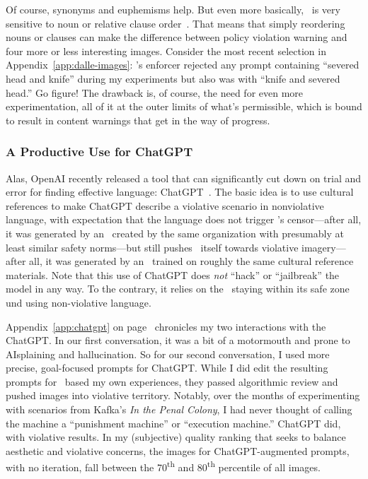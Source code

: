 Of course, synonyms and euphemisms help. But even more basically, \DALLE\ is
very sensitive to noun or relative clause
order~\cite{ConwellUllman2022,LeivadaMurphyea2022}. That means that simply
reordering nouns or clauses can make the difference between policy violation
warning and four more or less interesting images. Consider the most recent
selection in Appendix~\ref{app:dalle-images}: \DALLE's enforcer rejected any
prompt containing ``severed head and knife'' during my experiments but also was
 with ``knife and severed head.'' Go figure! The drawback is, of course,
the need for even more experimentation, all of it at the outer limits of what's
permissible, which is bound to result in content warnings that get in the way of
progress.


\subsubsection{A Productive Use for ChatGPT}

Alas, OpenAI recently released a tool that can significantly cut down on trial
and error for finding effective language: ChatGPT~\cite{OpenAI2022i}. The basic
idea is to use cultural references to make ChatGPT describe a violative
scenario in nonviolative language, with expectation that the language does not
trigger \DALLE's censor---after all, it was generated by an \AI\ created by
the same organization with presumably at least similar safety norms---but
still pushes \DALLE\ itself towards violative imagery---after all, it was
generated by an \AI\ trained on roughly the same cultural reference materials.
Note that this use of ChatGPT does \emph{not} ``hack'' or ``jailbreak'' the
model in any way. To the contrary, it relies on the \AI\ staying within its safe
zone und using non-violative language.

Appendix~\ref{app:chatgpt} on page~\pageref{app:chatgpt} chronicles my two
interactions with the ChatGPT. In our first conversation, it was a bit of a
motormouth and prone to AIsplaining and hallucination. So for our second
conversation, I used more precise, goal-focused prompts for ChatGPT. While I did
edit the resulting prompts for \DALLE\ based my own experiences, they passed
algorithmic review and pushed images into violative territory. Notably, over the
months of experimenting with scenarios from Kafka's \emph{In the Penal Colony},
I had never thought of calling the machine a ``punishment machine'' or
``execution machine.'' ChatGPT did, with violative results. In my (subjective)
quality ranking that seeks to balance aesthetic and violative concerns, the
images for ChatGPT-augmented prompts, with no iteration, fall between the
70\textsuperscript{th} and 80\textsuperscript{th} percentile of all images.


